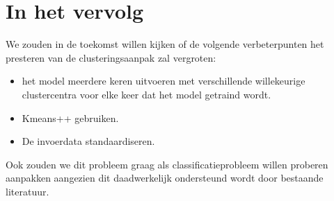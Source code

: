 \documentclass{article}
\begin{document}
\section{In het vervolg}

We zouden in de toekomst willen kijken of de volgende verbeterpunten het
presteren van de clusteringsaanpak zal vergroten:

\begin{itemize}
    \item het model meerdere keren uitvoeren met verschillende willekeurige
          clustercentra voor elke keer dat het model getraind wordt.
    \item Kmeans++ gebruiken.
    \item De invoerdata standaardiseren.
\end{itemize}

Ook zouden we dit probleem graag als classificatieprobleem willen proberen
aanpakken aangezien dit daadwerkelijk ondersteund wordt door bestaande
literatuur.

\printbibliography

\listoffigures

\listoftables
\end{document}
